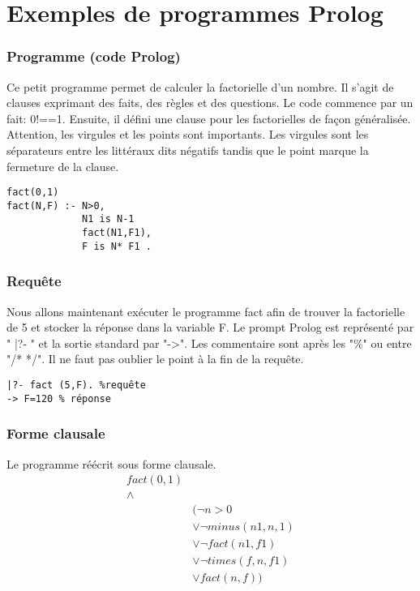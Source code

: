 
\author{Baptiste Degryse (27641200)}

\section{Exemples de programmes Prolog}

\subsubsection{Programme (code Prolog)}
Ce petit programme permet de calculer la factorielle d'un nombre. Il s'agit de clauses exprimant des faits, des règles et des questions. Le code commence par un fait: 0!==1. Ensuite, il défini une clause pour les factorielles de façon généralisée. Attention, les virgules et les points sont importants. Les virgules sont les séparateurs entre les littéraux dits négatifs tandis que le point marque la fermeture de la clause.
\begin{verbatim}
fact(0,1)
fact(N,F) :- N>0, 
			 N1 is N-1 
			 fact(N1,F1), 
			 F is N* F1 .
\end{verbatim}
\subsubsection{Requête} Nous allons maintenant exécuter le programme fact afin de trouver la factorielle de 5 et stocker la réponse dans la variable F. Le prompt Prolog est représenté par " |?- " et la sortie standard par "->". Les commentaire sont après les "\%" ou entre "/* */". Il ne faut pas oublier le point à la fin de la requête.
\begin{verbatim} 
|?- fact (5,F). %requête
-> F=120 % réponse
\end{verbatim}

\subsubsection{Forme clausale}
Le programme réécrit sous forme clausale. 
\begin{align*}
fact(0,1) \\
 \wedge & \\
&( \neg n > 0 \\
&	\vee \neg minus( n1, n, 1) \\
&	\vee \neg fact(n1, f1) \\
&	\vee \neg times(f, n, f1) \\
&	\vee fact(n, f) ) \\
\end{align*}



